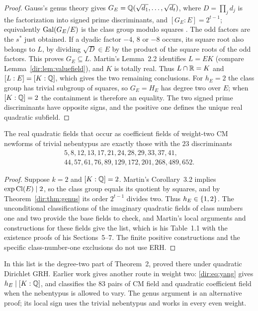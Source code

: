 \begin{proof}
Gauss's genus theory gives $G_E=\mathbb{Q}(\sqrt{d_1},\dots,\sqrt{d_t})$, where $D=\prod_jd_j$
is the factorization into signed prime discriminants, and $[G_E:E]=2^{t-1}$;
equivalently $\operatorname{Gal}(G_E/E)$ is the class group modulo squares \cite{LemmermeyerGenus}.
The odd factors are the $s^*$ just obtained. If a dyadic factor $-4$, $8$ or $-8$
occurs, its square root also belongs to $L$, by dividing $\sqrt D\in E$ by the product
of the square roots of the odd factors. This proves $G_E\subseteq L$. Martin's
Lemma~2.2 identifies $L=EK$ (compare Lemma~\ref{dir:lem:valuefield}), and $K$ is totally
real. Thus $L\cap\mathbb{R}=K$ and $[L:E]=[K:\mathbb{Q}]$, which gives the two remaining conclusions.
For $h_E=2$ the class group has trivial subgroup of squares, so $G_E=H_E$ has degree
two over $E$; when $[K:\mathbb{Q}]=2$ the containment is therefore an equality. The two signed
prime discriminants have opposite signs, and the positive one defines the unique real
quadratic subfield.
\end{proof}

\begin{corollary}
\label{dir:cor:cmquadratic}
The real quadratic fields that occur as coefficient fields of weight-two CM newforms
of trivial nebentypus are exactly those with the $23$ discriminants
\[
\begin{gathered}
 5,8,12,13,17,21,24,28,29,33,37,41,\\
 44,57,61,76,89,129,172,201,268,489,652 .
\end{gathered}
\]
\end{corollary}

\begin{proof}
Suppose $k=2$ and $[K:\mathbb{Q}]=2$. Martin's Corollary~3.2 implies $\exp\operatorname{Cl}(E)\mid2$, so the
class group equals its quotient by squares, and by Theorem~\ref{dir:thm:genus} its order
$2^{t-1}$ divides two. Thus $h_E\in\{1,2\}$. The unconditional classifications of the
imaginary quadratic fields of class numbers one and two \cite{Watkins2004Class} provide
the base fields to check, and Martin's local arguments and constructions for these
fields give the list, which is his Table~1.1 with the existence proofs of his
Sections~5--7. The finite positive constructions and the specific class-number-one
exclusions do not use ERH.
\end{proof}

In \cite{Martin2025Rationality} this list is the degree-two part of Theorem~2, proved
there under quadratic Dirichlet GRH. Earlier work gives another route in weight two:
\eqref{dir:eq:yang} gives $h_E\mid[K:\mathbb{Q}]$, and \cite[Theorem~3.2]{Gonzalez2011Endomorphism}
classifies the $83$ pairs of CM field and quadratic coefficient field when the
nebentypus is allowed to vary. The genus argument is an alternative proof; its local
sign uses the trivial nebentypus and works in every even weight.

